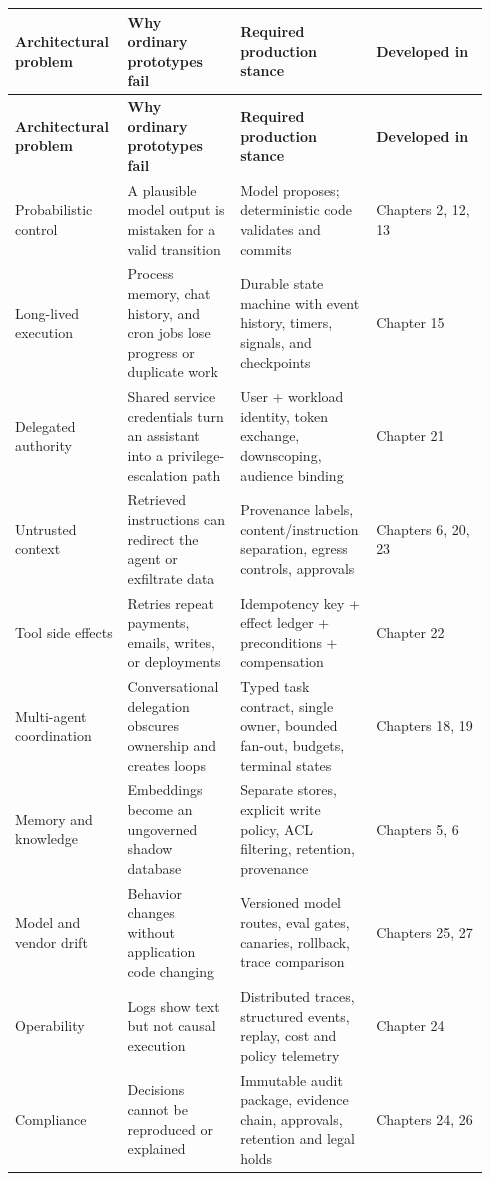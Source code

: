 \BookTableStart
\fontsize{7.2}{9}\selectfont
\begin{longtable}{@{}Y{0.2350\linewidth}Y{0.2350\linewidth}Y{0.2350\linewidth}Y{0.2350\linewidth}@{}}
\color{white}\bfseries \textbf{Architectural problem} & \color{white}\bfseries \textbf{Why ordinary prototypes fail} & \color{white}\bfseries \textbf{Required production stance} & \color{white}\bfseries \textbf{Developed in} \\
\endfirsthead
{}
\color{white}\bfseries \textbf{Architectural problem} & \color{white}\bfseries \textbf{Why ordinary prototypes fail} & \color{white}\bfseries \textbf{Required production stance} & \color{white}\bfseries \textbf{Developed in} \\
\endhead
Probabilistic control & A plausible model output is mistaken for a valid transition & Model proposes; deterministic code validates and commits & Chapters 2, 12, 13 \\
Long-lived execution & Process memory, chat history, and cron jobs lose progress or duplicate work & Durable state machine with event history, timers, signals, and checkpoints & Chapter 15 \\
Delegated authority & Shared service credentials turn an assistant into a privilege-escalation path & User + workload identity, token exchange, downscoping, audience binding & Chapter 21 \\
Untrusted context & Retrieved instructions can redirect the agent or exfiltrate data & Provenance labels, content/instruction separation, egress controls, approvals & Chapters 6, 20, 23 \\
Tool side effects & Retries repeat payments, emails, writes, or deployments & Idempotency key + effect ledger + preconditions + compensation & Chapter 22 \\
Multi-agent coordination & Conversational delegation obscures ownership and creates loops & Typed task contract, single owner, bounded fan-out, budgets, terminal states & Chapters 18, 19 \\
Memory and knowledge & Embeddings become an ungoverned shadow database & Separate stores, explicit write policy, ACL filtering, retention, provenance & Chapters 5, 6 \\
Model and vendor drift & Behavior changes without application code changing & Versioned model routes, eval gates, canaries, rollback, trace comparison & Chapters 25, 27 \\
Operability & Logs show text but not causal execution & Distributed traces, structured events, replay, cost and policy telemetry & Chapter 24 \\
Compliance & Decisions cannot be reproduced or explained & Immutable audit package, evidence chain, approvals, retention and legal holds & Chapters 24, 26 \\
\end{longtable}
\BookTableEnd

